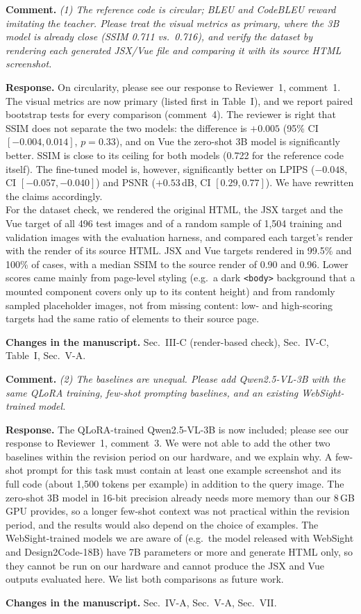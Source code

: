 \documentclass[11pt,a4paper]{article}
\newcommand{\rev}[1]{\par\noindent\textbf{Comment.} \textit{#1}\par}
\newcommand{\resp}{\par\noindent\textbf{Response.} }
\newcommand{\change}[1]{\par\noindent\textbf{Changes in the manuscript.} #1\par\medskip}
\begin{document}
\rev{(1) The reference code is circular; BLEU and CodeBLEU reward imitating the
teacher. Please treat the visual metrics as primary, where the 3B model is already
close (SSIM 0.711 vs.\ 0.716), and verify the dataset by rendering each generated
JSX/Vue file and comparing it with its source HTML screenshot.}
\resp On circularity, please see our response to Reviewer~1, comment~1. The visual
metrics are now primary (listed first in Table~I), and we report paired bootstrap
tests for every comparison (comment~4). The reviewer is right that SSIM does not
separate the two models: the difference is $+0.005$ (95\% CI $[-0.004, 0.014]$,
$p=0.33$), and on Vue the zero-shot 3B model is significantly better. SSIM is
close to its ceiling for both models (0.722 for the reference code itself). The
fine-tuned model is, however, significantly better on LPIPS ($-0.048$, CI
$[-0.057, -0.040]$) and PSNR ($+0.53$\,dB, CI $[0.29, 0.77]$). We have rewritten
the claims accordingly.\\
For the dataset check, we rendered the original HTML, the JSX target and the Vue
target of all 496 test images and of a random sample of 1,504 training and
validation images with the evaluation harness, and compared each target's render
with the render of its source HTML. JSX and Vue targets rendered in 99.5\% and
100\% of cases, with a median SSIM to the source render of 0.90 and 0.96. Lower
scores came mainly from page-level styling (e.g.\ a dark \texttt{<body>}
background that a mounted component covers only up to its content height) and
from randomly sampled placeholder images, not from missing content: low- and
high-scoring targets had the same ratio of elements to their source page.
\change{Sec.~III-C (render-based check), Sec.~IV-C, Table~I, Sec.~V-A.}

\rev{(2) The baselines are unequal. Please add Qwen2.5-VL-3B with the same QLoRA
training, few-shot prompting baselines, and an existing WebSight-trained model.}
\resp The QLoRA-trained Qwen2.5-VL-3B is now included; please see our response to
Reviewer~1, comment~3. We were not able to add the other two baselines within the
revision period on our hardware, and we explain why. A few-shot prompt for this
task must contain at least one example screenshot and its full code (about 1,500
tokens per example) in addition to the query image. The zero-shot 3B model in
16-bit precision already needs more memory than our 8\,GB GPU provides, so a
longer few-shot context was not practical within the revision period, and the
results would also depend on the choice of examples. The WebSight-trained models
we are aware of (e.g.\ the model released with WebSight and Design2Code-18B) have
7B parameters or more and generate HTML only, so they cannot be run on our
hardware and cannot produce the JSX and Vue outputs evaluated here. We list both
comparisons as future work.
\change{Sec.~IV-A, Sec.~V-A, Sec.~VII.}
\end{document}
